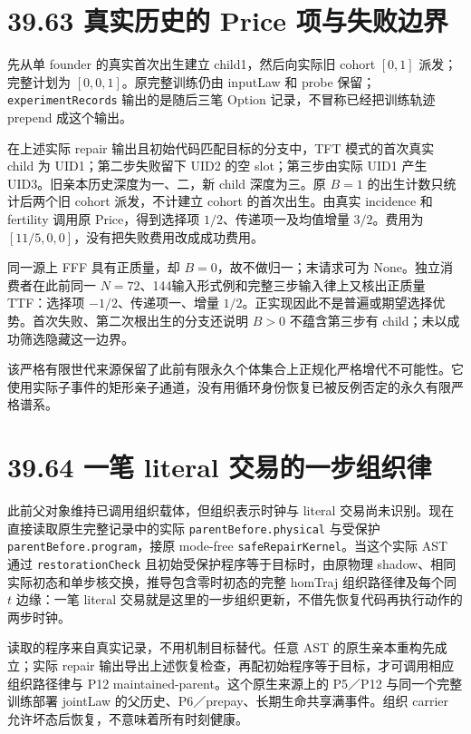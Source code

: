 \documentclass[
  11pt,
  oneside]{book}
\begin{document}
\section{39.63 真实历史的 Price 项与失败边界}\label{ux771fux5b9eux5386ux53f2ux7684-price-ux9879ux4e0eux5931ux8d25ux8fb9ux754c}

先从单 founder 的真实首次出生建立 child1，然后向实际旧 cohort \([0,1]\) 派发；完整计划为 \([0,0,1]\)。原完整训练仍由 inputLaw 和 probe 保留；\nolinkurl{experimentRecords} 输出的是随后三笔 Option 记录，不冒称已经把训练轨迹 prepend 成这个输出。

在上述实际 repair 输出且初始代码匹配目标的分支中，TFT 模式的首次真实 child 为 UID1；第二步失败留下 UID2 的空 slot；第三步由实际 UID1 产生 UID3。旧亲本历史深度为一、二，新 child 深度为三。原 \(B=1\) 的出生计数只统计后两个旧 cohort 派发，不计建立 cohort 的首次出生。由真实 incidence 和 fertility 调用原 Price，得到选择项 \(1/2\)、传递项一及均值增量 \(3/2\)。费用为 \([11/5,0,0]\)，没有把失败费用改成成功费用。

同一源上 FFF 具有正质量，却 \(B=0\)，故不做归一；末请求可为 None。独立消费者在此前同一 \(N=72\)、144输入形式例和完整三步输入律上又核出正质量 TTF：选择项 \(-1/2\)、传递项一、增量 \(1/2\)。正实现因此不是普遍或期望选择优势。首次失败、第二次根出生的分支还说明 \(B>0\) 不蕴含第三步有 child；未以成功筛选隐藏这一边界。

该严格有限世代来源保留了此前有限永久个体集合上正规化严格增代不可能性。它使用实际子事件的矩形亲子通道，没有用循环身份恢复已被反例否定的永久有限严格谱系。

\section{39.64 一笔 literal 交易的一步组织律}\label{ux4e00ux7b14-literal-ux4ea4ux6613ux7684ux4e00ux6b65ux7ec4ux7ec7ux5f8b}

此前父对象维持已调用组织载体，但组织表示时钟与 literal 交易尚未识别。现在直接读取原生完整记录中的实际 \nolinkurl{parentBefore.physical} 与受保护 \nolinkurl{parentBefore.program}，接原 mode-free \nolinkurl{safeRepairKernel}。当这个实际 AST 通过 \nolinkurl{restorationCheck} 且初始受保护程序等于目标时，由原物理 shadow、相同实际初态和单步核交换，推导包含零时初态的完整 homTraj 组织路径律及每个同 \(t\) 边缘：一笔 literal 交易就是这里的一步组织更新，不借先恢复代码再执行动作的两步时钟。

读取的程序来自真实记录，不用机制目标替代。任意 AST 的原生亲本重构先成立；实际 repair 输出导出上述恢复检查，再配初始程序等于目标，才可调用相应组织路径律与 P12 maintained-parent。这个原生来源上的 P5／P12 与同一个完整训练部署 jointLaw 的父历史、P6／prepay、长期生命共享满事件。组织 carrier 允许坏态后恢复，不意味着所有时刻健康。
\end{document}
